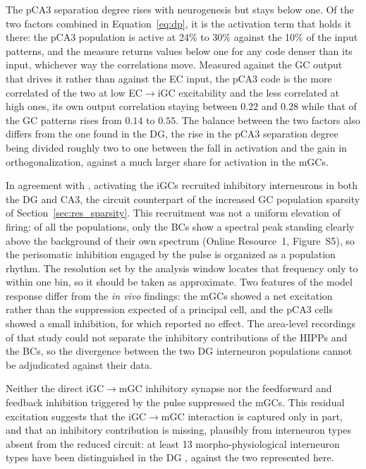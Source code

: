 \documentclass[pdflatex,sn-basic]{sn-jnl}%
\theoremstyle{thmstyleone}%
\theoremstyle{thmstyletwo}%
\theoremstyle{thmstylethree}%
\begin{document}
The pCA3 separation degree rises with neurogenesis but stays below one. Of the two factors combined in Equation~\ref{eq:dp}, it is
the activation term that holds it there: the pCA3 population is active at 24\% to 30\% against the 10\% of the input patterns, and
the measure returns values below one for any code denser than its input, whichever way the correlations move. Measured against the
GC output that drives it rather than against the EC input, the pCA3 code is the more correlated of the two at low EC$\to$iGC
excitability and the less correlated at high ones, its own output correlation staying between $0.22$ and $0.28$ while that of the
GC patterns rises from $0.14$ to $0.55$. The balance between the two factors also differs from the one found in the DG, the rise
in the pCA3 separation degree being divided roughly two to one between the fall in activation and the gain in orthogonalization,
against a much larger share for activation in the mGCs.

In agreement with \citet{mchughAdultborn2022}, activating the iGCs recruited inhibitory interneurons in both the DG and CA3, the
circuit counterpart of the increased GC population sparsity of Section~\ref{sec:res_sparsity}. This recruitment was not a uniform
elevation of firing: of all the populations, only the BCs show a spectral peak standing clearly above the background of their own
spectrum (Online Resource~1, Figure~S5), so the perisomatic inhibition engaged by the pulse is organized as a population rhythm.
The resolution set by the analysis window locates that frequency only to within one bin, so it should be taken as approximate. Two
features of the model response differ from the \textit{in vivo} findings: the mGCs showed a net excitation rather than the
suppression expected of a principal cell, and the pCA3 cells showed a small inhibition, for which \citet{mchughAdultborn2022}
reported no effect. The area-level recordings of that study could not separate the inhibitory contributions of the HIPPs and the
BCs, so the divergence between the two DG interneuron populations cannot be adjudicated against their data.

Neither the direct iGC$\to$mGC inhibitory synapse nor the feedforward and feedback inhibition triggered by the pulse suppressed
the mGCs. This residual excitation suggests that the iGC$\to$mGC interaction is captured only in part, and that an inhibitory
contribution is missing, plausibly from interneuron types absent from the reduced circuit: at least 13 morpho-physiological
interneuron types have been distinguished in the DG \citep{degroInterneuron2022}, against the two represented here.
\end{document}
